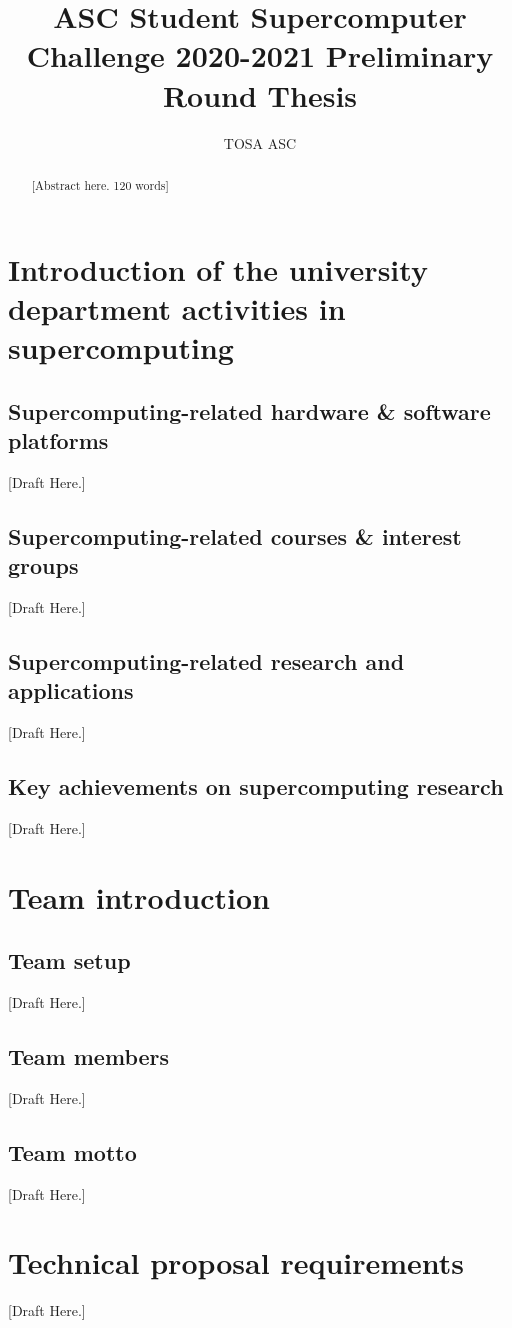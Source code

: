 \documentclass[a4paper, 11pt]{article}
\title{ASC Student Supercomputer Challenge 2020-2021 Preliminary Round Thesis}
\author{TOSA ASC}
\begin{document}
	\maketitle
	
	\begin{abstract}
		[Abstract here. 120 words]
	\end{abstract}
	
	\tableofcontents
	\newpage
	
	

	\section{Introduction of the university department activities in supercomputing}
		\subsection{Supercomputing-related hardware \& software platforms} [Draft Here.]
		\subsection{Supercomputing-related courses \& interest groups} [Draft Here.]
		\subsection{Supercomputing-related research and applications} [Draft Here.]
		\subsection{Key achievements on supercomputing research} [Draft Here.]
	\section{Team introduction}
		\subsection{Team setup} [Draft Here.]
		\subsection{Team members} [Draft Here.]
		\subsection{Team motto} [Draft Here.]
		
	\section{Technical proposal requirements}
		[Draft Here.]
\end{document}
